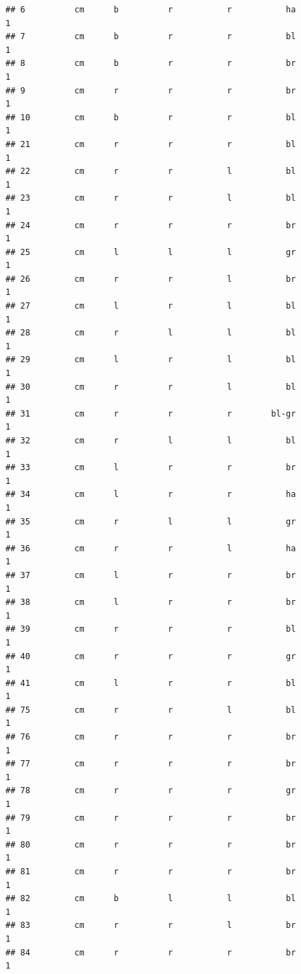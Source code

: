 \documentclass[]{article}
\begin{document}
\begin{verbatim}
## 6          cm      b          r           r           ha             1
## 7          cm      b          r           r           bl             1
## 8          cm      b          r           r           br             1
## 9          cm      r          r           r           br             1
## 10         cm      b          r           r           bl             1
## 21         cm      r          r           r           bl             1
## 22         cm      r          r           l           bl             1
## 23         cm      r          r           l           bl             1
## 24         cm      r          r           r           br             1
## 25         cm      l          l           l           gr             1
## 26         cm      r          r           l           br             1
## 27         cm      l          r           l           bl             1
## 28         cm      r          l           l           bl             1
## 29         cm      l          r           l           bl             1
## 30         cm      r          r           l           bl             1
## 31         cm      r          r           r        bl-gr             1
## 32         cm      r          l           l           bl             1
## 33         cm      l          r           r           br             1
## 34         cm      l          r           r           ha             1
## 35         cm      r          l           l           gr             1
## 36         cm      r          r           l           ha             1
## 37         cm      l          r           r           br             1
## 38         cm      l          r           r           br             1
## 39         cm      r          r           r           bl             1
## 40         cm      r          r           r           gr             1
## 41         cm      l          r           r           bl             1
## 75         cm      r          r           l           bl             1
## 76         cm      r          r           r           br             1
## 77         cm      r          r           r           br             1
## 78         cm      r          r           r           gr             1
## 79         cm      r          r           r           br             1
## 80         cm      r          r           r           br             1
## 81         cm      r          r           r           br             1
## 82         cm      b          l           l           bl             1
## 83         cm      r          r           l           br             1
## 84         cm      r          r           r           br             1

\end{verbatim}
\end{document}
